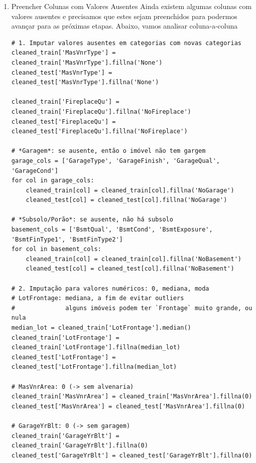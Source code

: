 \documentclass[11pt]{article}
\begin{document}
\begin{enumerate}
\begin{enumerate}
\begin{enumerate}
\begin{verbatim}
# Colunas com muitos dados ausentes são eliminadas
cols_to_drop = ['PoolQC', 'MiscFeature', 'Alley', 'Fence']
cleaned_train = cleaned_train.drop(columns=cols_to_drop)
cleaned_test = cleaned_test.drop(columns=cols_to_drop)
\end{verbatim}
\end{enumerate}
\item Preencher Colunas com Valores Ausentes
\label{sec:orgb862646}
Ainda existem algumas colunas com valores ausentes e precisamos que estes sejam preenchidos para podermos avançar para as próximas etapas. Abaixo, vamos analisar coluna-a-coluna
\begin{verbatim}
# 1. Imputar valores ausentes em categorias com novas categorias
cleaned_train['MasVnrType'] = cleaned_train['MasVnrType'].fillna('None')
cleaned_test['MasVnrType'] = cleaned_test['MasVnrType'].fillna('None')

cleaned_train['FireplaceQu'] = cleaned_train['FireplaceQu'].fillna('NoFireplace')
cleaned_test['FireplaceQu'] = cleaned_test['FireplaceQu'].fillna('NoFireplace')

# *Garagem*: se ausente, então o imóvel não tem gargem
garage_cols = ['GarageType', 'GarageFinish', 'GarageQual', 'GarageCond']
for col in garage_cols:
    cleaned_train[col] = cleaned_train[col].fillna('NoGarage')
    cleaned_test[col] = cleaned_test[col].fillna('NoGarage')

# *Subsolo/Porão*: se ausente, não há subsolo
basement_cols = ['BsmtQual', 'BsmtCond', 'BsmtExposure', 'BsmtFinType1', 'BsmtFinType2']
for col in basement_cols:
    cleaned_train[col] = cleaned_train[col].fillna('NoBasement')
    cleaned_test[col] = cleaned_test[col].fillna('NoBasement')

# 2. Imputação para valores numéricos: 0, mediana, moda
# LotFrontage: mediana, a fim de evitar outliers
#              alguns imóveis podem ter `Frontage` muito grande, ou nula
median_lot = cleaned_train['LotFrontage'].median()
cleaned_train['LotFrontage'] = cleaned_train['LotFrontage'].fillna(median_lot)
cleaned_test['LotFrontage'] = cleaned_test['LotFrontage'].fillna(median_lot)

# MasVnrArea: 0 (-> sem alvenaria)
cleaned_train['MasVnrArea'] = cleaned_train['MasVnrArea'].fillna(0)
cleaned_test['MasVnrArea'] = cleaned_test['MasVnrArea'].fillna(0)

# GarageYrBlt: 0 (-> sem garagem)
cleaned_train['GarageYrBlt'] = cleaned_train['GarageYrBlt'].fillna(0)
cleaned_test['GarageYrBlt'] = cleaned_test['GarageYrBlt'].fillna(0)


\end{verbatim}
\end{enumerate}
\end{enumerate}
\end{document}
